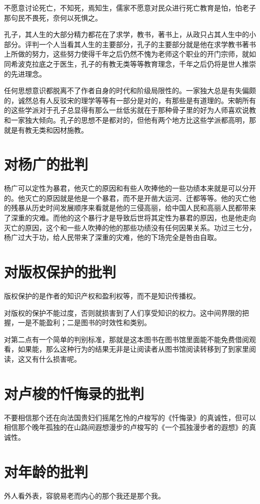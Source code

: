 \documentclass[12pt,oneside]{book}
\begin{document}
不愿意讨论死亡，不知死，焉知生，儒家不愿意对民众进行死亡教育是怕，怕老子那句民不畏死，奈何以死惧之。

孔子，其人生的大部分精力都花在了求学，教书，著书上，从政只占其人生中的小部分。评判一个人当看其人生的主要部分，孔子的主要部分就是他在求学教书著书上所做的努力，这些努力使得千年之后仍然不愧为老师这个职业的开门宗师，就如同希波克拉底之于医生，孔子的有教无类等等教育理念，千年之后仍将是世人推崇的先进理念。

任何思想意识都脱离不了作者自身的时代和阶级局限性的。一家独大总是有失偏颇的，诚然总有人反驳宋的理学等等有一部分是对的，有那些是有道理的。宋朝所有的这些学派对于孔子总显得有那么一丝低劣就在于那种骨子里的好为人师喜欢说教和一家独大倾向。孔子的思想不是都对的，但他有两个地方比这些学派都高明，那就是有教无类和因材施教。​

\chapter{对杨广的批判}
杨广可以定性为暴君，他灭亡的原因和有些人吹捧他的一些功绩本来就是可以分开的。他灭亡的原因就是他是一个暴君，而不是开凿大运河、迁都等等。他的灭亡他的残暴从历史时间发展顺序来看就是他的三侵高丽，给中国人民和高丽人民都带来了深重的灾难。而他的这个暴行才是导致后世将其定性为暴君的原因，也是他走向灭亡的原因，这个和一些人吹捧的他的那些功绩没有任何因果关系。功过三七分，杨广过大于功，给人民带来了深重的灾难，他的下场完全是咎由自取。

\chapter{对版权保护的批判}
版权保护的是作者的知识产权和盈利权等，而不是知识传播权。

对版权的保护不能过度，否则就损害到了人们享受知识的权力。这中间界限的把握，一是不能盈利；二是图书的时效性和类别。

对第二点有一个简单的判别标准，那就是这本图书在图书馆里面能不能免费借阅观看，如果能，那么这种行为的结果无非是让阅读者从图书馆阅读转移到了到家里阅读，这又有什么损害呢。




\chapter{对卢梭的忏悔录的批判}
不要相信那个还在向法国贵妇们摇尾乞怜的卢梭写的《忏悔录》的真诚性，但可以相信那个晚年孤独的在山路间遐想漫步的卢梭写的《一个孤独漫步者的遐想》的真诚性。

\chapter{对年龄的批判}
外人看外表，容貌易老而内心的那个我还是那个我。
\end{document}
